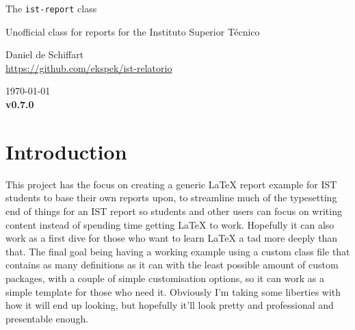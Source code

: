 \documentclass[palatino,english]{ist-report}
\begin{document}
\institution{}
\title{}

\begin{center}
	\vspace*{1cm}
	{\huge The \texttt{ist-report} class}
	\medskip\par
	{\Large Unofficial class for reports for the Instituto Superior Técnico}
	\bigskip\bigskip\par
	{\large Daniel de Schiffart} \\
	{\url{https://github.com/ekspek/ist-relatorio}}
	\bigskip\smallskip\par
	\today \\
	\textbf{v0.7.0}
\end{center}
\vspace*{1cm}

\begin{abstract}
	This \LaTeX{} class was developed as an unofficial template for reports developed for the Instituto Superior Técnico of Universidade de Lisboa, themed around the style the university has developed for its own internal documentation, complemented by using specifications defined by the university itself, all the while taking some creative liberties with the missing definitions.
	
	This document details the class file, what it exactly contains, what its options are, and a concise documentation of its development, which will grow as the class file progresses. The class file itself, \texttt{ist-report.cls}, should be in the same directory as the \texttt{doc.tex} file.
\end{abstract}

\tableofcontents

\section{Introduction}

This project has the focus on creating a generic \LaTeX{} report example for IST students to base their own reports upon, to streamline much of the typesetting end of things for an IST report so students and other users can focus on writing content instead of spending time getting \LaTeX{} to work. Hopefully it can also work as a first dive for those who want to learn \LaTeX{} a tad more deeply than that. The final goal being having a working example using a custom class file that contains as many definitions as it can with the least possible amount of custom packages, with a couple of simple customisation options, so it can work as a simple template for those who need it. Obviously I'm taking some liberties with how it will end up looking, but hopefully it'll look pretty and professional and presentable enough.
\end{document}
